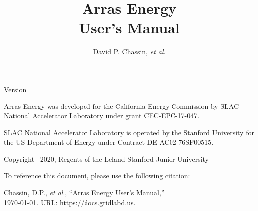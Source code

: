 \documentclass{article}
\title 
{
	\LARGE Arras Energy
\\
	User's Manual
}
\author {
	David P. Chassin, \textit{et al}.
}
\begin{document}
\maketitle

\begin{center}

Version 

\vspace{0.5in}

Arras Energy was developed for the California Energy Commission by SLAC National Accelerator Laboratory under grant CEC-EPC-17-047.

\vspace{0.5in}

SLAC National Accelerator Laboratory is operated by the Stanford University for the US Department of Energy under Contract DE-AC02-76SF00515.

\vspace{0.5in}

Copyright \textcopyright~2020, Regents of the Leland Stanford Junior University

\vspace{0.5in}

To reference this document, please use the following citation:

Chassin, D.P., \textit{et al}., ``Arras Energy User's Manual,''\\\today. URL: https://docs.gridlabd.us.

\end{center}


\end{document}
